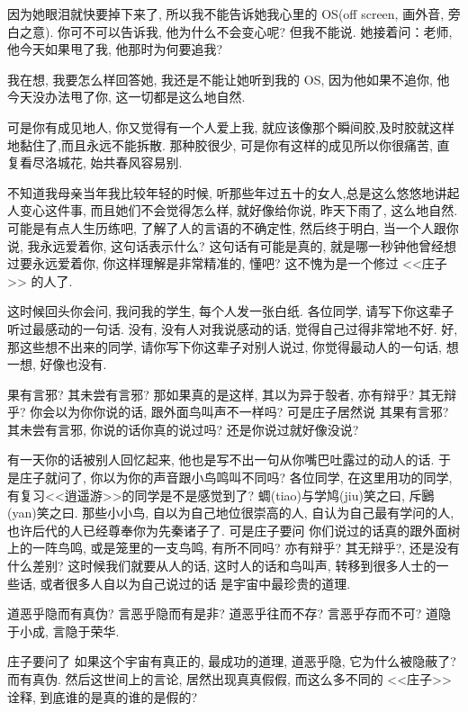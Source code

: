\documentclass[11pt]{article}
\begin{document}
因为她眼泪就快要掉下来了, 所以我不能告诉她我心里的 OS(off screen, 画外音, 旁白之意). 你可不可以告诉我, 他为什么不会变心呢? 但我不能说. 她接着问：老师, 他今天如果甩了我, 他那时为何要追我?

我在想, 我要怎么样回答她, 我还是不能让她听到我的 OS, 因为他如果不追你, 他今天没办法甩了你, 这一切都是这么地自然.

可是你有成见地人, 你又觉得有一个人爱上我, 就应该像那个瞬间胶,及时胶就这样地黏住了,而且永远不能拆散. 那种胶很少, 可是你有这样的成见所以你很痛苦, 直复看尽洛城花, 始共春风容易别.

不知道我母亲当年我比较年轻的时候, 听那些年过五十的女人,总是这么悠悠地讲起人变心这件事, 而且她们不会觉得怎么样, 就好像给你说, 昨天下雨了, 这么地自然. 可能是有点人生历练吧, 了解了人的言语的不确定性, 然后终于明白, 当一个人跟你说, 我永远爱着你, 这句话表示什么? 这句话有可能是真的, 就是哪一秒钟他曾经想过要永远爱着你, 你这样理解是非常精准的, 懂吧? 这不愧为是一个修过 <<庄子>> 的人了.

这时候回头你会问, 我问我的学生, 每个人发一张白纸. 各位同学, 请写下你这辈子听过最感动的一句话. 没有, 没有人对我说感动的话, 觉得自己过得非常地不好. 好, 那这些想不出来的同学, 请你写下你这辈子对别人说过, 你觉得最动人的一句话, 想一想, 好像也没有. 

{\color{blue} 果有言邪? 其未尝有言邪?} 那如果真的是这样, {\color{blue} 其以为异于彀者, 亦有辩乎? 其无辩乎?} 你会以为你你说的话, 跟外面鸟叫声不一样吗? 	可是庄子居然说{\color{blue} 其果有言邪? 其未尝有言邪}, 你说的话你真的说过吗? 还是你说过就好像没说?

有一天你的话被别人回忆起来, 他也是写不出一句从你嘴巴吐露过的动人的话. 于是庄子就问了, 你以为你的声音跟小鸟鸣叫不同吗? 各位同学, 在这里用功的同学, 有复习<<逍遥游>>的同学是不是感觉到了? 蜩(tiao)与学鸠(jiu)笑之曰, 斥鶠(yan)笑之曰. 那些小小鸟, 自以为自己地位很崇高的人, 自认为自己最有学问的人, 也许后代的人已经尊奉你为先秦诸子了. 可是庄子要问 你们说过的话真的跟外面树上的一阵鸟鸣, 或是笼里的一支鸟鸣, 有所不同吗? {\color{blue} 亦有辩乎? 其无辩乎?}, 还是没有什么差别? 这时候我们就要从人的话, 这时人的话和鸟叫声, 转移到很多人士的一些话, 或者很多人自以为自己说过的话 是宇宙中最珍贵的道理.

{\begin{center}
		{\color{green} 道恶乎隐而有真伪? 言恶乎隐而有是非? 道恶乎往而不存? 言恶乎存而不可? 道隐于小成, 言隐于荣华. }
\end{center}}

\vspace{-0.5cm}

庄子要问了 如果这个宇宙有真正的, 最成功的道理, {\color{blue} 道恶乎隐}, 它为什么被隐蔽了? {\color{blue} 而有真伪}. 然后这世间上的言论, 居然出现真真假假, 而这么多不同的 <<庄子>> 诠释, 到底谁的是真的谁的是假的?
\end{document}
